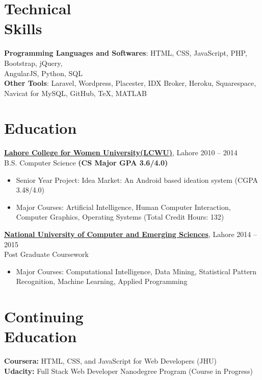 \documentclass[margin,line]{res}
\begin{document}
\begin{resume}
\section{Technical \\Skills}
{\bf Programming Languages and Softwares}: HTML, CSS,  JavaScript, PHP, Bootstrap, jQuery, \\AngularJS, Python, SQL
\\{\bf Other Tools}: Laravel, Wordpress, Placester, IDX Broker, Heroku, Squarespace, Navicat for MySQL, GitHub, \TeX, MATLAB


\section{Education} 

\href{http://www.lcwu.edu.pk/}{\bf Lahore College for Women University(LCWU)}, Lahore \hfill 2010 -- 2014\\ B.S. Computer Science \hfill\textbf{(CS Major GPA 3.6/4.0)}
\begin{itemize} \itemsep -2pt  %
 \item Senior Year Project: Idea Market: An Android based ideation system \hfill(CGPA 3.48/4.0)
 \item  Major Courses: Artificial Intelligence, Human Computer Interaction,\\ Computer Graphics, Operating Systems (Total Credit Hours: 132)
 \end{itemize}

\href{http://www.nu.edu.pk/}{\bf National University of Computer and Emerging Sciences}, Lahore \hfill 2014 -- 2015\\ Post Graduate Coursework \hfill\
\begin{itemize} \itemsep -2pt  %
 \item Major Courses: Computational Intelligence, Data Mining, Statistical Pattern Recognition, Machine Learning, Applied Programming
 \end{itemize}


\section{Continuing \\Education}
{\bf Coursera:} HTML, CSS, and JavaScript for Web Developers (JHU)\\
{\bf Udacity:} Full Stack Web Developer Nanodegree Program (Course in Progress)


\end{resume}
\end{document}
